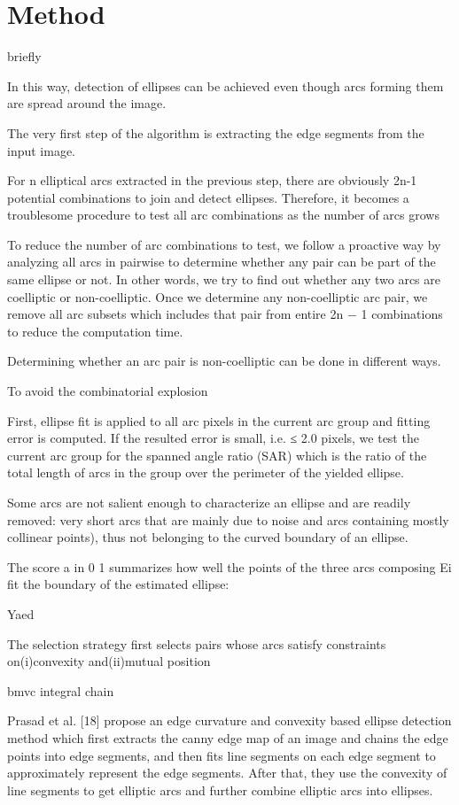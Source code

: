 \documentclass[a4paper]{report}
\begin{document}
\section{Method}
briefly

In this way, detection of ellipses can be achieved even though arcs forming them are spread around the image.

The very first step of the algorithm is extracting the edge segments from the input image.

For n elliptical arcs extracted in the previous step, there are obviously 2n-1 potential combinations to join and detect ellipses.
Therefore, it becomes a troublesome procedure to test all arc combinations as the number of arcs grows

To reduce the number of arc combinations to test, we follow a proactive way by analyzing all arcs in pairwise to determine whether any pair can be part of the same ellipse or not. In other words, we try to find out whether any
two arcs are coelliptic or non-coelliptic. Once we determine any non-coelliptic arc pair, we remove all arc subsets which includes that pair from entire 2n − 1 combinations to reduce the computation time.

Determining whether an arc pair is non-coelliptic can be done in different ways.

To avoid the combinatorial explosion


First, ellipse fit is applied to all arc pixels in the current arc group and fitting error is computed. 
If the resulted error is small, i.e. ≤ 2.0 pixels, we test the current arc group for the spanned angle ratio
(SAR) which is the ratio of the total length of arcs in the group over the perimeter of the yielded ellipse.


Some arcs are not salient enough to characterize an ellipse
and are readily removed: very short arcs that are
mainly due to noise and arcs containing mostly collinear points), thus not belonging to the curved
boundary of an ellipse.


The score a in 0 1
summarizes how well the points of the three arcs composing Ei fit the boundary of the estimated ellipse:


Yaed

The selection strategy first selects pairs whose arcs satisfy constraints on(i)convexity and(ii)mutual position



bmvc integral chain

Prasad et al. [18] propose an edge curvature and convexity
based ellipse detection method which first extracts the canny edge map of an image
and chains the edge points into edge segments, and then fits line segments on each edge
segment to approximately represent the edge segments. After that, they use the convexity of
line segments to get elliptic arcs and further combine elliptic arcs into ellipses. 
\end{document}

